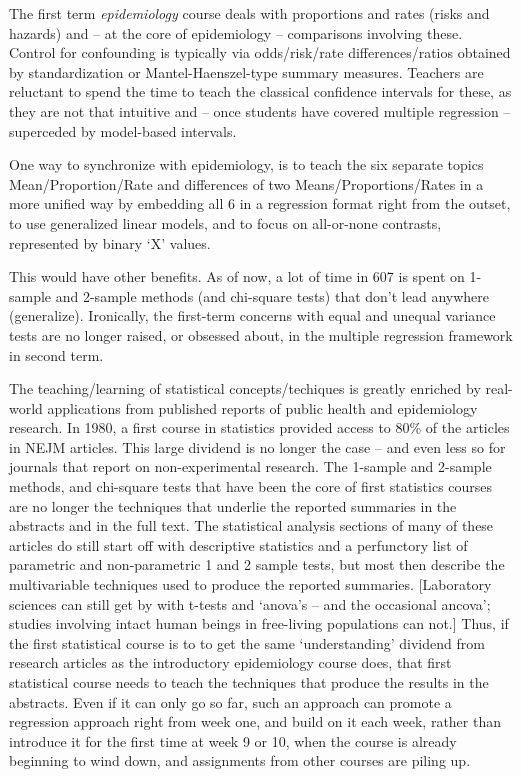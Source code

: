 \documentclass[]{book}
\begin{document}
The first term \emph{epidemiology} course deals with proportions and rates (risks and hazards) and -- at the core of epidemiology -- comparisons involving these. Control for confounding is typically via odds/risk/rate differences/ratios obtained by standardization or Mantel-Haenszel-type summary measures. Teachers are reluctant to spend the time to teach the classical confidence intervals for these, as they are not that intuitive and -- once students have covered multiple regression -- superceded by model-based intervals.

One way to synchronize with epidemiology, is to teach the six separate topics Mean/Proportion/Rate and differences of two Means/Proportions/Rates in a more unified way by embedding all 6 in a regression format right from the outset, to use generalized linear models, and to focus on all-or-none contrasts, represented by binary `X' values.

This would have other benefits. As of now, a lot of time in 607 is spent on 1-sample and 2-sample methods (and chi-square tests) that don't lead anywhere (generalize). Ironically, the first-term concerns with equal and unequal variance tests are no longer raised, or obsessed about, in the multiple regression framework in second term.

The teaching/learning of statistical concepts/techiques is greatly enriched by real-world applications from published reports of public health and epidemiology research. In 1980, a first course in statistics provided access to 80\% of the articles in NEJM articles. This large dividend is no longer the case -- and even less so for journals that report on non-experimental research. The 1-sample and 2-sample methods, and chi-square tests that have been the core of first statistics courses are no longer the techniques that underlie the reported summaries in the abstracts and in the full text. The statistical analysis sections of
many of these articles do still start off with descriptive statistics and a perfunctory list of parametric and non-parametric 1 and 2 sample tests, but most then describe the multivariable techniques used to produce the reported summaries. {[}Laboratory sciences can still get by with t-tests and `anova's -- and the occasional ancova'; studies involving intact human beings in free-living populations can not.{]} Thus, if the first statistical course is to to get the same `understanding' dividend from research articles as the introductory epidemiology course does, that first statistical course needs to teach the techniques that produce the results in the abstracts. Even if it can only go so far, such an approach can promote a regression approach right from week one, and build on it each week, rather than introduce it for the first time at week 9 or 10, when the course is already beginning to wind down, and assignments from other courses are piling up.
\end{document}
